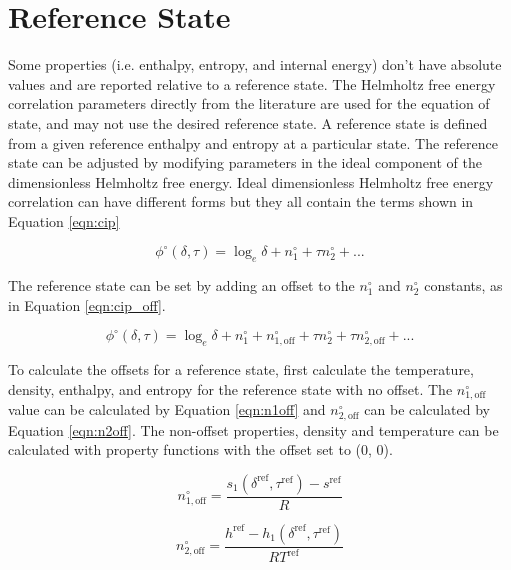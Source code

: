 \documentclass[oneside]{book}
\begin{document}
\section{Reference State}

Some properties (i.e. enthalpy, entropy, and internal energy) don't have absolute values and are reported relative to a reference state. The Helmholtz free energy correlation parameters directly from the literature are used for the equation of state, and may not use the desired reference state.  A reference state is defined from a given reference enthalpy and entropy at a particular state. The reference state can be adjusted by modifying parameters in the ideal component of the dimensionless Helmholtz free energy.  Ideal dimensionless Helmholtz free energy correlation can have different forms but they all contain the terms shown in Equation \ref{eqn:cip}

\begin{equation}\label{eqn:cip}
	\phi^\circ(\delta, \tau) = \log_e \delta + n_1^\circ + \tau n_2^\circ + ...
\end{equation}

The reference state can be set by adding an offset to the $n_1^\circ$ and $n_2^\circ$ constants, as in Equation \ref{eqn:cip_off}.

\begin{equation}\label{eqn:cip_off}
	\phi^\circ(\delta, \tau) = \log_e \delta + n_1^\circ + n^\circ_{1, \text{off}} + \tau n_2^\circ + \tau n^\circ_{2, \text{off}} +  ...
\end{equation}

To calculate the offsets for a reference state, first calculate the temperature, density, enthalpy, and entropy for the reference state with no offset. The $n^\circ_{1, \text{off}}$ value can be calculated by Equation \ref{eqn:n1off} and  $n^\circ_{2, \text{off}}$ can be calculated by Equation \ref{eqn:n2off}. The non-offset properties, density and temperature can be calculated with property functions with the offset set to (0, 0).

\begin{equation}\label{eqn:n1off}
	n^\circ_{1, \text{off}} = \frac{s_1(\delta^{\text{ref}}, \tau^{\text{ref}}) - s^{\text{ref}}}{R}
\end{equation}

\begin{equation}\label{eqn:n2off}
	n^\circ_{2, \text{off}} = \frac{h^{\text{ref}} - h_1(\delta^{\text{ref}}, \tau^{\text{ref}})}{RT^{\text{ref}}}
\end{equation}
\end{document}
